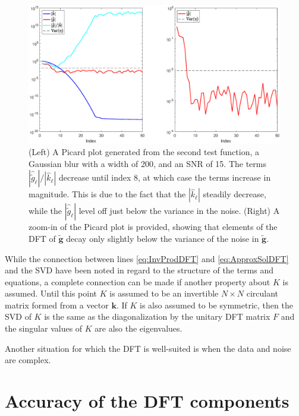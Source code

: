 \documentclass[12pt,notitlepage]{report}
\newcommand{\gnoise}{\widetilde{g}}	%
\newcommand{\gnoiseVec}{\widetilde{\mathbf{g}}}	%
\newcommand{\kVec}{\mathbf{k}}	%
\newcommand{\kMat}{K}	%
\begin{document}
\begin{figure}[htb]
	\centerline{\includegraphics[scale = 0.45]{Figures/PicardPlot1D_F2_S15_W200.eps}}
\caption{(Left) A Picard plot generated from the second test function, a Gaussian blur with a width of 200, and an SNR of 15. The terms $|\widehat{\gnoise}_\ell|/|\widehat{k}_\ell|$ decrease until index 8, at which case the terms increase in magnitude. This is due to the fact that the $|\widehat{k}_\ell|$ steadily decrease, while the $|\widehat{\gnoise}_\ell|$ level off just below the variance in the noise. (Right) A zoom-in of the Picard plot is provided, showing that elements of the DFT of $\gnoiseVec$ decay only slightly below the variance of the noise in $\gnoiseVec$.}
\label{PicardPlot}
\end{figure}

While the connection between lines \eqref{eq:InvProdDFT} and \eqref{eq:ApproxSolDFT} and the SVD have been noted in regard to the structure of the terms and equations, a complete connection can be made if another property about $\kMat$ is assumed. Until this point $\kMat$ is assumed to be an invertible $N \times N$ circulant matrix formed from a vector $\kVec$. If $\kMat$ is also assumed to be symmetric, then the SVD of $\kMat$ is the same as the diagonalization by the unitary DFT matrix $F$ and the singular values of $\kMat$ are also the eigenvalues. \par 
Another situation for which the DFT is well-suited is when the data and noise are complex.  

\section{Accuracy of the DFT components} \label{sec:Accuracy of DFT}
\end{document}
